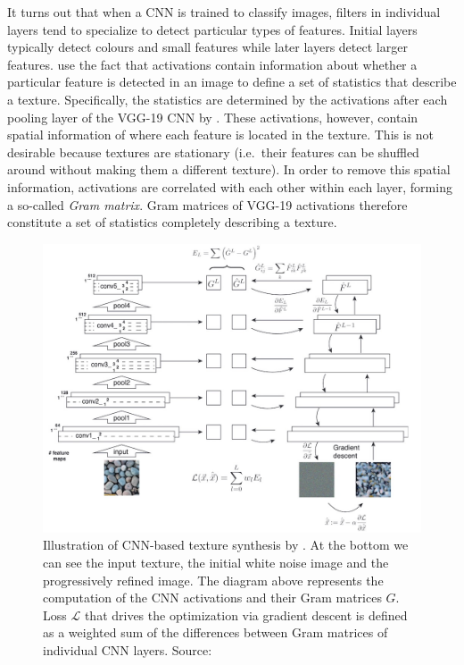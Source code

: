 It turns out that when a CNN is trained to classify images, filters in individual layers tend to specialize to detect particular types of features. Initial layers typically detect colours and small features while later layers detect larger features. \citet{Gatys2015} use the fact that activations contain information about whether a particular feature is detected in an image to define a set of statistics that describe a texture. Specifically, the statistics are determined by the activations after each pooling layer of the VGG-19 CNN by \citet{Simonyan2014}. These activations, however, contain spatial information of where each feature is located in the texture. This is not desirable because textures are stationary (i.e.~their features can be shuffled around without making them a different texture). In order to remove this spatial information, activations are correlated with each other within each layer, forming a so-called \textit{Gram matrix}. Gram matrices of VGG-19 activations therefore constitute a set of statistics completely describing a texture.

\begin{figure}[ht]
    \centering
    \includegraphics[width=\textwidth]{images/02-gatys_method.jpg}
    \caption{Illustration of CNN-based texture synthesis by \citet{Gatys2015}. At the bottom we can see the input texture, the initial white noise image and the progressively refined image. The diagram above represents the computation of the CNN activations and their Gram matrices \(G\). Loss \(\mathcal{L}\) that drives the optimization via gradient descent is defined as a weighted sum of the differences between Gram matrices of individual CNN layers. Source: \citet{Gatys2015}}
    \label{fig:background_gatys_method}
\end{figure}

